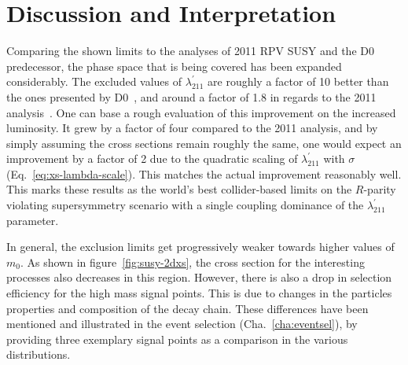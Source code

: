 \section{Discussion and Interpretation}
\label{sec:discussion}

Comparing the shown limits to the analyses of 2011 RPV SUSY and the D0 predecessor, the phase space that is being covered has been expanded considerably. The excluded values of $\lambda^{\prime}_{211}$ are roughly a factor of 10 better than the ones presented by D0~\cite{auter,d0rpv}, and around a factor of 1.8 in regards to the 2011 analysis~\cite{2011rpv}. One can base a rough evaluation of this improvement on the increased luminosity. It grew by a factor of four compared to the 2011 analysis, and by simply assuming the cross sections remain roughly the same, one would expect an improvement by a factor of 2 due to the quadratic scaling of $\lambda^\prime_{211}$ with $\sigma$ (Eq.~\ref{eq:xs-lambda-scale}). This matches the actual improvement reasonably well. This marks these results as the world's best collider-based limits on the $R$-parity violating supersymmetry scenario with a single coupling dominance of the $\lambda^{\prime}_{211}$ parameter.

In general, the exclusion limits get progressively weaker towards higher values of $m_0$. As shown in figure~\ref{fig:susy-2dxs}, the cross section for the interesting processes also decreases in this region. However, there is also a drop in selection efficiency for the high mass signal points. This is due to changes in the particles properties and composition of the decay chain. These differences have been mentioned and illustrated in the event selection (Cha.~\ref{cha:eventsel}), by providing three exemplary signal points as a comparison in the various distributions.


